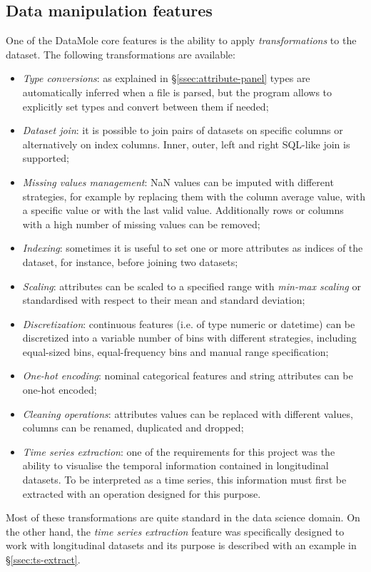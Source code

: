 \subsection{Data manipulation features}
\label{sec:data-transform}
One of the DataMole core features is the ability to apply \textit{transformations} to the dataset. The following transformations are available:
\begin{itemize}
	\item \textit{Type conversions}: as explained in §\ref{ssec:attribute-panel} types are automatically inferred when a file is parsed, but the program allows to explicitly set types and convert between them if needed;
	\item \textit{Dataset join}: it is possible to join pairs of datasets on specific columns or alternatively on index columns. Inner, outer, left and right SQL-like join is supported;
	\item \textit{Missing values management}: NaN values can be imputed with different strategies, for example by replacing them with the column average value, with a specific value or with the last valid value. Additionally rows or columns with a high number of missing values can be removed;
	\item \textit{Indexing}: sometimes it is useful to set one or more attributes as indices of the dataset, for instance, before joining two datasets;
	\item \textit{Scaling}: attributes can be scaled to a specified range with \textit{min-max scaling} or standardised with respect to their mean and standard deviation;
	\item \textit{Discretization}: continuous features (i.e. of type numeric or datetime) can be discretized into a variable number of bins with different strategies, including equal-sized bins, equal-frequency bins and manual range specification;
	\item \textit{One-hot encoding}: nominal categorical features and string attributes can be one-hot encoded;
	\item \textit{Cleaning operations}: attributes values can be replaced with different values, columns can be renamed, duplicated and dropped;
	\item \textit{Time series extraction}: one of the requirements for this project was the ability to visualise the temporal information contained in longitudinal datasets. To be interpreted as a time series, this information must first be extracted with an operation designed for this purpose.
\end{itemize}
Most of these transformations are quite standard in the data science domain. On the other hand, the \textit{time series extraction} feature was specifically designed to work with longitudinal datasets and its purpose is described with an example in §\ref{ssec:ts-extract}.

